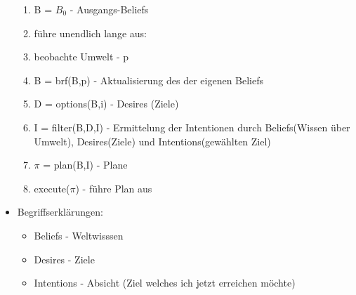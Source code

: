 \documentclass{article} %
\begin{document}
\begin{itemize}
		\begin{enumerate}
			\item B = $B_{0}$ - Ausgangs-Beliefs
			\item führe unendlich lange aus:
			\item beobachte Umwelt - p
			\item B = brf(B,p) - Aktualisierung des der eigenen Beliefs
			\item D = options(B,i) - Desires (Ziele)
			\item I = filter(B,D,I) - Ermittelung der Intentionen durch Beliefs(Wissen über Umwelt), Desires(Ziele) und Intentions(gewählten Ziel)
			\item $\pi$ = plan(B,I) - Plane
			\item execute($\pi$) - führe Plan aus
		\end{enumerate}
		\item Begriffserklärungen:
		\begin{itemize}
			\item Beliefs - Weltwisssen
			\item Desires - Ziele
			\item  Intentions - Absicht (Ziel welches ich jetzt erreichen möchte)
		\end{itemize}
	\end{itemize}
\end{document}

